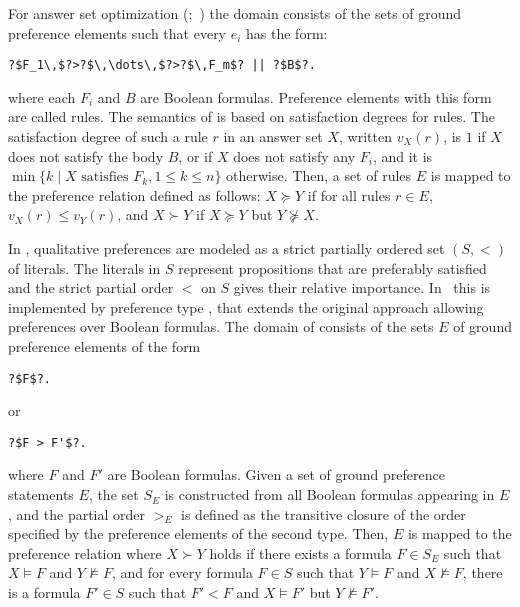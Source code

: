 For answer set optimization (;~\cite{brnitr03a})
the domain consists of the sets of ground preference elements 
 such that every $e_i$ has the form:
\begin{lstlisting}[numbers=none,escapechar=?]
?$F_1\,$?>?$\,\dots\,$?>?$\,F_m$? || ?$B$?.
\end{lstlisting}
where each $F_i$ and $B$ are Boolean formulas.
Preference elements with this form are called  rules.  
The semantics of  is based on satisfaction degrees for  rules. %
The satisfaction degree of such a rule $r$ in an answer set $X$, 
written $v_X(r)$, is 
$1$ if $X$ does not satisfy the body $B$, %
or  if $X$ does not satisfy any $F_i$, 
and it is $\min\{k \mid X \text{ satisfies } F_k, 1\leq k\leq n\}$ otherwise.
Then, a set of  rules $E$ is mapped to the preference relation defined as follows:
$X \succeq Y$ if for all rules $r \in E$, $v_X(r) \leq v_Y(r)$, 
and $X \succ Y$ if $X \succeq Y$ but $Y \not\succeq X$. 

In \cite{giumar12a}, qualitative preferences are modeled as a strict partially ordered set
\(
(S,<)
\)
of literals.
The literals in $S$ represent propositions that are preferably satisfied
and the strict partial order $<$ on $S$ gives their relative importance.
%
In \asprin\ this is implemented by preference type , 
that extends the original approach allowing preferences over Boolean formulas.
The domain of  consists of the sets $E$ of ground preference elements of the form
\begin{lstlisting}[numbers=none,escapechar=?]
?$F$?.
\end{lstlisting}
or 
\begin{lstlisting}[numbers=none,escapechar=?]
?$F > F'$?.
\end{lstlisting}
where $F$ and $F'$ are Boolean formulas.
Given a set of ground preference statements $E$, 
the set $S_E$ is constructed from all Boolean formulas appearing in $E$, 
and the partial order $>_E$ is defined as the transitive closure of the order 
specified by the preference elements of the second type. 
Then, $E$ is mapped to the preference relation where 
$X \succ Y$ holds if 
there exists a formula $F \in S_E$ such that $X \models F$ and $Y \not\models F$, 
and for every formula $F \in S$ such that $Y \models F$ and $X \not\models F$, 
there is a formula
$F'\in S$ such that $F'<F$ and $X \models F'$ but $Y \not\models F'$.

